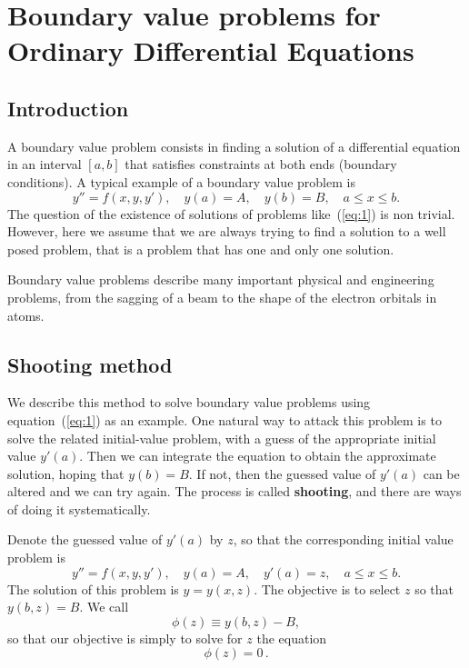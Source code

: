 
\chapter[Boundary value problems]{Boundary value problems for Ordinary Differential Equations}

\section{Introduction}

A boundary value problem consists in finding a solution of a
differential equation in an interval $[a,b]$ that satisfies
constraints at both ends (boundary conditions).  A typical example of
a boundary value problem is
%
\begin{equation}
  y'' = f(x,y,y'), \quad y(a) = A, \quad y(b) = B, \quad a \le x \le b.
  \label{eq:1}
\end{equation}
%
The question of the existence of solutions of problems
like~(\ref{eq:1}) is non trivial.  However, here we assume that we are
always trying to find a solution to a well posed problem, that is a
problem that has one and only one solution.

Boundary value problems describe many important physical and
engineering problems, from the sagging of a beam to the shape of the
electron orbitals in atoms.

\section{Shooting method}

We describe this method to solve boundary value problems using
equation~(\ref{eq:1}) as an example.  One natural way to attack this
problem is to solve the related initial-value problem, with a guess of
the appropriate initial value $y'(a)$. Then we can integrate the
equation to obtain the approximate solution, hoping that $y(b)=B$. If
not, then the guessed value of $y'(a)$ can be altered and we can try
again. The process is called {\bf shooting}, and there are ways of
doing it systematically.

\medskip

\noindent
Denote the guessed value of $y'(a)$ by $z$, so that the corresponding
initial value problem is
%
\begin{equation}
  y''=f(x,y,y'), \quad y(a)=A, \quad y'(a)=z, \quad a \le x \le b.\label{ivp}
\end{equation}
%
The solution of this problem is $y=y(x,z)$. The objective is to select
$z$ so that $y(b,z)=B$. We call
%
\begin{equation}
  \phi(z) \equiv y(b,z)-B ,
  \label{eq:phiz}
\end{equation}
%
so that our objective is simply to solve for $z$ the equation
%
\begin{equation}
 \phi(z)=0 \,.
 \label{eq:2}
\end{equation}
%

